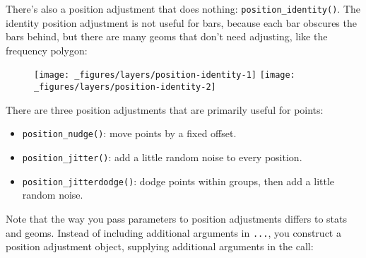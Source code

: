 There's also a position adjustment that does nothing:
\texttt{position\_identity()}. The identity position adjustment is not
useful for bars, because each bar obscures the bars behind, but there
are many geoms that don't need adjusting, like the frequency polygon:

\begin{Shaded}
\begin{Highlighting}[]
\StringTok{ }\NormalTok{(} \NormalTok{, }  \NormalTok{/}\StringTok{ }\NormalTok{, } \NormalTok{)}

 \StringTok{ }
\StringTok{  }\NormalTok{(}\NormalTok{(}  \NormalTok{) +}\StringTok{ }
\StringTok{  }\NormalTok{(}\NormalTok{) +}\StringTok{ }\NormalTok{(}\NormalTok{) +}\StringTok{ }
\StringTok{  }\NormalTok{(} \NormalTok{)}
\end{Highlighting}
\end{Shaded}

\begin{figure}[H]
  \texttt{[image: \_figures/layers/position-identity-1]}%
  \texttt{[image: \_figures/layers/position-identity-2]}
\end{figure}

There are three position adjustments that are primarily useful for
points:

\begin{itemize}
\tightlist
\item
  \texttt{position\_nudge()}: move points by a fixed offset.
\item
  \texttt{position\_jitter()}: add a little random noise to every
  position.
\item
  \texttt{position\_jitterdodge()}: dodge points within groups, then add
  a little random noise.
\end{itemize}

 

Note that the way you pass parameters to position adjustments differs to
stats and geoms. Instead of including additional arguments in
\texttt{...}, you construct a position adjustment object, supplying
additional arguments in the call:

